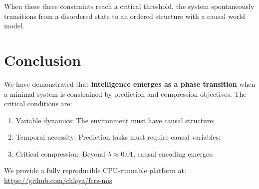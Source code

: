 \documentclass[11pt]{article}
\begin{document}
When these three constraints reach a critical threshold, the system spontaneously transitions from a disordered state to an ordered structure with a causal world model.

\section{Conclusion}

We have demonstrated that \textbf{intelligence emerges as a phase transition} when a minimal system is constrained by prediction and compression objectives. The critical conditions are:
\begin{enumerate}
    \item Variable dynamics: The environment must have causal structure;
    \item Temporal necessity: Prediction tasks must require causal variables;
    \item Critical compression: Beyond $\lambda \approx 0.01$, causal encoding emerges.
\end{enumerate}

We provide a fully reproducible CPU-runnable platform at: \url{https://github.com/chleya/fcrs-mis}



\end{document}
